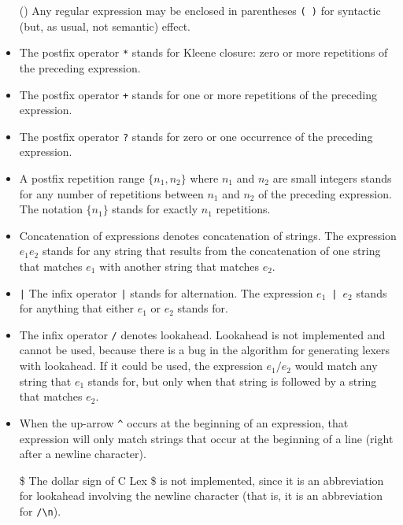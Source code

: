 \documentclass{article}
\begin{document}
\begin{itemize}
\item[()] Any regular expression may be enclosed in parentheses \verb|( )|
	for syntactic (but, as usual, not semantic) effect.

\item[\verb|*|]	The postfix operator \verb|*| stands for Kleene closure:
	zero or more repetitions of the preceding expression.

\item[\verb|+|]	The postfix operator \verb|+| stands for one or more repetitions
	of the preceding expression.

\item[\verb|?|]	The postfix operator \verb|?| stands for zero or one occurrence of
	the preceding expression.

\item	A postfix repetition range $\{n_1,n_2\}$ where $n_1$ and $n_2$ are small
	integers stands for any number of repetitions between $n_1$ and $n_2$
	of the preceding expression.  The notation $\{n_1\}$ stands for
	exactly $n_1$ repetitions.

\item	Concatenation of expressions denotes concatenation of strings.
	The expression $e_1 e_2$ stands for any string that results from
	the concatenation of one string that matches $e_1$ with another
	string that matches $e_2$.

\item\verb-|-	The infix operator \verb-|- stands for alternation.  The expression
	$e_1$~\verb"|"~$e_2$  stands for anything that either $e_1$ or $e_2$ stands for.
    
\item[\verb|/|]	The infix operator \verb|/| denotes lookahead.  Lookahead is not
        implemented and cannot be used, because there is a bug
        in the algorithm for generating lexers with lookahead.  If
        it could be used, the expression $e_1 / e_2$ would match any string
        that $e_1$ stands for, but only when that string is followed by a
        string that matches $e_2$.

\item	When the up-arrow \verb|^| occurs at the beginning of an expression,
	that expression will only match strings that occur at the
	beginning of a line (right after a newline character).

\item[\$]   The dollar sign of C Lex \$ is not implemented, since it is an abbreviation
        for lookahead involving the newline character (that is, it
        is an abbreviation for \verb|/\n|).
\end{itemize}
	
\end{document}
